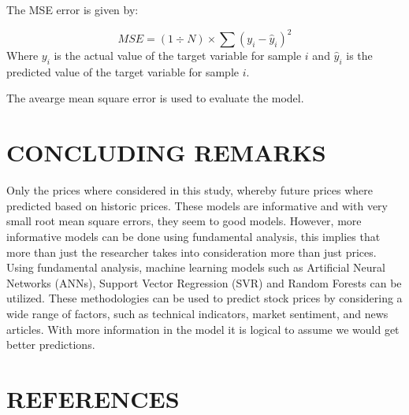 \documentclass[
]{article}
\begin{document}
The MSE error is given by:

\[MSE = (1\div{N})\times\sum(y_i - \hat{y}_i)^2\] Where \(y_i\) is the
actual value of the target variable for sample \(i\) and \(\hat{y}_i\)
is the predicted value of the target variable for sample \(i\).

The avearge mean square error is used to evaluate the model.

\hypertarget{concluding-remarks}{%
\section{CONCLUDING REMARKS}\label{concluding-remarks}}

Only the prices where considered in this study, whereby future prices
where predicted based on historic prices. These models are informative
and with very small root mean square errors, they seem to good models.
However, more informative models can be done using fundamental analysis,
this implies that more than just the researcher takes into consideration
more than just prices. Using fundamental analysis, machine learning
models such as Artificial Neural Networks (ANNs), Support Vector
Regression (SVR) and Random Forests can be utilized. These methodologies
can be used to predict stock prices by considering a wide range of
factors, such as technical indicators, market sentiment, and news
articles. With more information in the model it is logical to assume we
would get better predictions.

\hypertarget{references}{%
\section{REFERENCES}\label{references}}


\end{document}
